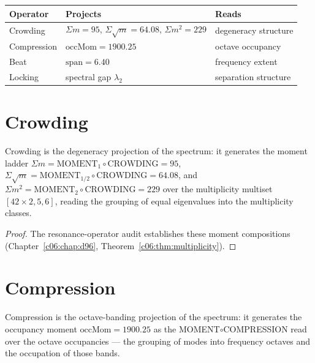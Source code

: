 \begin{center}
\begin{tabular}{lll}
\hline
Operator & Projects & Reads \\
\hline
Crowding & $\Sigma m=95$, $\Sigma\sqrt{m}=64.08$, $\Sigma m^2=229$ & degeneracy structure \\
Compression & $\mathrm{occMom}=1900.25$ & octave occupancy \\
Beat & $\mathrm{span}=6.40$ & frequency extent \\
Locking & spectral gap $\lambda_2$ & separation structure \\
\hline
\end{tabular}
\end{center}

\section{Crowding}
\label{c07:sec:crowding}

\begin{theorem}
\label{c07:thm:crowding-moments}
Crowding is the degeneracy projection of the spectrum: it generates the moment ladder
$\Sigma m = \mathrm{MOMENT}_1\circ\mathrm{CROWDING} = 95$, $\Sigma\sqrt{m} =
\mathrm{MOMENT}_{1/2}\circ\mathrm{CROWDING} = 64.08$, and $\Sigma m^2 =
\mathrm{MOMENT}_2\circ\mathrm{CROWDING} = 229$ over the multiplicity multiset
$[42\times2,5,6]$, reading the grouping of equal eigenvalues into the multiplicity classes.
\end{theorem}

\begin{proof}
The resonance-operator audit \cite{c07:QG261} establishes these moment compositions
(Chapter~\ref{c06:chap:d96}, Theorem~\ref{c06:thm:multiplicity}).
\end{proof}

\section{Compression}
\label{c07:sec:compression}

\begin{theorem}
\label{c07:thm:compression-occupancy}
Compression is the octave-banding projection of the spectrum: it generates the occupancy
moment $\mathrm{occMom} = 1900.25$ as the MOMENT$\circ$COMPRESSION read over the octave
occupancies --- the grouping of modes into frequency octaves and the occupation of those
bands.
\end{theorem}

